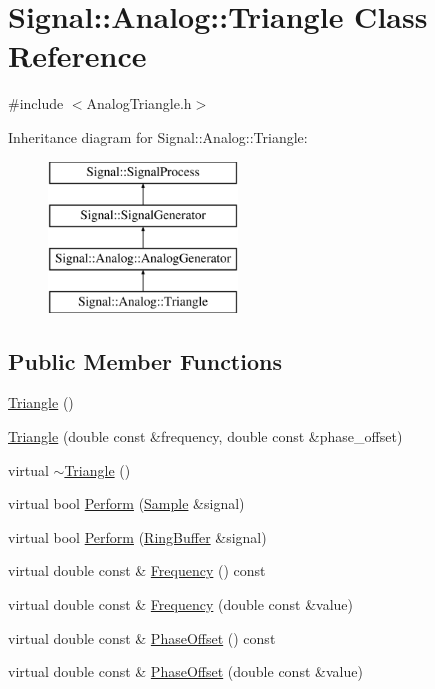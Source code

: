 \hypertarget{classSignal_1_1Analog_1_1Triangle}{\section{Signal\+:\+:Analog\+:\+:Triangle Class Reference}
\label{classSignal_1_1Analog_1_1Triangle}
}


{\ttfamily \#include $<$Analog\+Triangle.\+h$>$}

Inheritance diagram for Signal\+:\+:Analog\+:\+:Triangle\+:\begin{figure}[H]
\begin{center}
\leavevmode
\includegraphics[height=4.000000cm]{classSignal_1_1Analog_1_1Triangle}
\end{center}
\end{figure}
\subsection*{Public Member Functions}
\begin{DoxyCompactItemize}
\item 
\hyperlink{classSignal_1_1Analog_1_1Triangle_af8827886e424d88225d2f864d524911c}{Triangle} ()
\item 
\hyperlink{classSignal_1_1Analog_1_1Triangle_ab45d2028a87c4faa0ee6298603c2ce6b}{Triangle} (double const \&frequency, double const \&phase\+\_\+offset)
\item 
virtual \hyperlink{classSignal_1_1Analog_1_1Triangle_a97a9d15bb951cfd8b7acb62834842cb7}{$\sim$\+Triangle} ()
\item 
virtual bool \hyperlink{classSignal_1_1Analog_1_1Triangle_af632a5d8f427483a402262fe77c13f86}{Perform} (\hyperlink{classSignal_1_1Sample}{Sample} \&signal)
\item 
virtual bool \hyperlink{classSignal_1_1Analog_1_1Triangle_aa82395dde8a4d1d66fb20c1f5c984fab}{Perform} (\hyperlink{classSignal_1_1RingBuffer}{Ring\+Buffer} \&signal)
\item 
virtual double const \& \hyperlink{classSignal_1_1SignalGenerator_a96af42ee68f94e9b04d034fd68b73ecd}{Frequency} () const 
\item 
virtual double const \& \hyperlink{classSignal_1_1SignalGenerator_af83b532bf3ddc3637c2fd7a1dfd095cb}{Frequency} (double const \&value)
\item 
virtual double const \& \hyperlink{classSignal_1_1SignalGenerator_ac2538ec946f001e394d2416fda698d1c}{Phase\+Offset} () const 
\item 
virtual double const \& \hyperlink{classSignal_1_1SignalGenerator_ac6a103ff72beaa338f6d18c812522d78}{Phase\+Offset} (double const \&value)
\end{DoxyCompactItemize}
